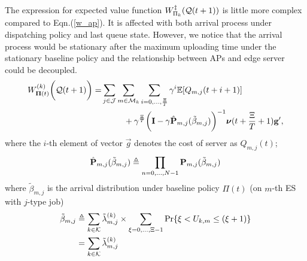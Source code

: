 The expression for expected value function $W^{\ddagger}_{\Pi_{k}}(\mathcal{Q}(t+1))$ is little more complex compared to Eqn.(\ref{w_ap}).
It is affected with both arrival process under dispatching policy and last queue state.
However, we notice that the arrival process would be stationary after the maximum uploading time under the stationary baseline policy and the relationship between APs and edge server could be decoupled.
\begin{align}
    W^{(k)}_{\boldsymbol{\Pi}(t)}\bigg(\mathcal{Q}(t+1)\bigg)
    =& \sum_{j\in\mathcal{J}}\sum_{m\in\mathcal{M}_{k}}\sum_{i=0,\dots,\frac{\Xi}{T}} \gamma^{i} \mathbb{E}[ Q_{m,j}({t+i+1}) ]
    \nonumber\\
    &~~~~~~~~+ \gamma^{\frac{\Xi}{T}} \bigg( \mathbf{I} - \gamma \hat{\mathbf{P}}_{m,j}(\tilde{\beta}_{m,j}) \bigg)^{-1} \boldsymbol{\nu}({t+\frac{\Xi}{T}+1}) \mathbf{g}',
\end{align}
where the $i$-th element of vector $\vec{g}$ denotes the cost of server as $Q_{m,j}(t)$;
\begin{align}
    \hat{\mathbf{P}}_{m,j}(\tilde{\beta}_{m,j}) \triangleq \prod_{n=0,\dots,N-1} \mathbf{P}_{m,j}(\tilde{\beta}_{m,j})
\end{align}
where $\tilde{\beta}_{m,j}$ is the arrival distribution under baseline policy $\Pi(t)$ (on $m$-th ES with $j$-type job)
\begin{align}
    \tilde{\beta}_{m,j} &\triangleq \sum_{k\in\mathcal{K}} \tilde{\lambda}^{(k)}_{m,j} \times \sum_{\xi=0,\dots,\Xi-1} \Pr\{ \xi<U_{k,m}\leq(\xi+1) \}
        \nonumber\\
    ~~~~&= \sum_{k\in\mathcal{K}} \tilde{\lambda}^{(k)}_{m,j}
\end{align}

